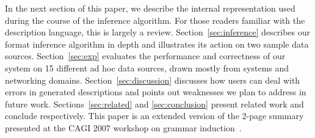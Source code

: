 In the next section of this paper, we describe the internal representation
used during the course of the inference algorithm.  For those
readers familiar with the \pads{} description language, this is largely a 
review.  Section~\ref{sec:inference} describes our format inference algorithm
in depth and illustrates its action on two sample data sources.  
Section~\ref{sec:exp} evaluates the performance and correctness of our
system on 15 different ad hoc data sources, drawn mostly from systems
and networking domains.  Section~\ref{sec:discussion} discusses
how users can deal with errors
in generated descriptions and points out weaknesses 
we plan to address in future work.
Sections~\ref{sec:related} and \ref{sec:conclusion} present related work
and conclude respectively.  This paper is an extended version of the
2-page summary presented at the CAGI 2007 workshop on grammar induction~\cite{burke+:cagi07}. 







